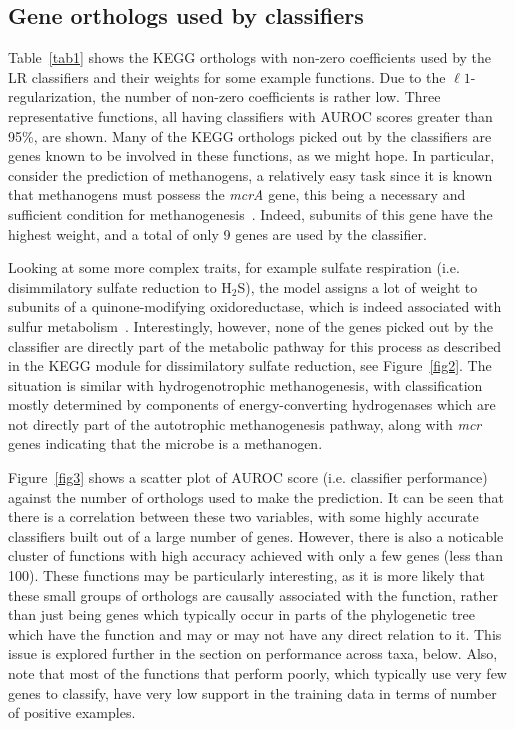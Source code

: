 \documentclass[10pt,letterpaper]{article}
\begin{document}
\subsection*{Gene orthologs used by classifiers}
Table~\ref{tab1} shows the KEGG orthologs with non-zero coefficients used by the LR classifiers and their weights for some example functions. Due to the $\ell1$-regularization, the number of non-zero coefficients is rather low. Three representative functions, all having classifiers with AUROC scores greater than 95\%, are shown. Many of the KEGG orthologs picked out by the classifiers are genes known to be involved in these functions, as we might hope. In particular, consider the prediction of methanogens, a relatively easy task since it is known that methanogens must possess the \emph{mcrA} gene, this being a necessary and sufficient condition for methanogenesis~\cite{Deppenmeier2002}. Indeed, subunits of this gene have the highest weight, and a total of only 9 genes are used by the classifier. 

Looking at some more complex traits, for example sulfate respiration (i.e. disimmilatory sulfate reduction to H$_{2}$S), the model assigns a lot of weight to subunits of a quinone-modifying oxidoreductase, which is indeed associated with sulfur metabolism~\cite{Chan2009}. Interestingly, however, none of the genes picked out by the classifier are directly part of the metabolic pathway for this process as described in the KEGG module for dissimilatory sulfate reduction, see Figure~\ref{fig2}. The situation is similar with hydrogenotrophic methanogenesis, with classification mostly determined by components of energy-converting hydrogenases which are not directly part of the autotrophic methanogenesis pathway, along with \emph{mcr} genes indicating that the microbe is a methanogen.  

Figure~\ref{fig3} shows a scatter plot of AUROC score (i.e. classifier performance) against the number of orthologs used to make the prediction. It can be seen that there is a correlation between these two variables, with some highly accurate classifiers built out of a large number of genes. However, there is also a noticable cluster of functions with high accuracy achieved with only a few genes (less than 100). These functions may be particularly interesting, as it is more likely that these small groups of orthologs are causally associated with the function, rather than just being genes which typically occur in parts of the phylogenetic tree which have the function and may or may not have any direct relation to it. This issue is explored further in the section on performance across taxa, below. Also, note that most of the functions that perform poorly, which typically use very few genes to classify, have very low support in the training data in terms of number of positive examples.
\end{document}
